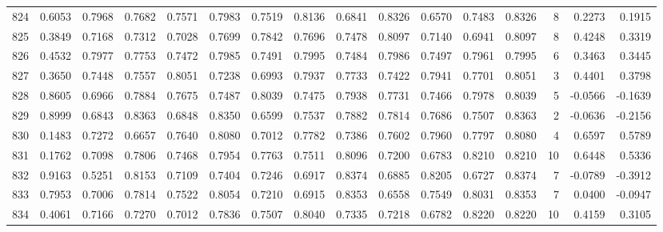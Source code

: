 \begin{tabular}{lrrrrrrrrrrrrrrr}
824 &      0.6053 &  0.7968 &  0.7682 &  0.7571 &  0.7983 &  0.7519 &  0.8136 &  0.6841 &  0.8326 &  0.6570 &   0.7483 &     0.8326 &      8 &                    0.2273 &                     0.1915 \\
825 &      0.3849 &  0.7168 &  0.7312 &  0.7028 &  0.7699 &  0.7842 &  0.7696 &  0.7478 &  0.8097 &  0.7140 &   0.6941 &     0.8097 &      8 &                    0.4248 &                     0.3319 \\
826 &      0.4532 &  0.7977 &  0.7753 &  0.7472 &  0.7985 &  0.7491 &  0.7995 &  0.7484 &  0.7986 &  0.7497 &   0.7961 &     0.7995 &      6 &                    0.3463 &                     0.3445 \\
827 &      0.3650 &  0.7448 &  0.7557 &  0.8051 &  0.7238 &  0.6993 &  0.7937 &  0.7733 &  0.7422 &  0.7941 &   0.7701 &     0.8051 &      3 &                    0.4401 &                     0.3798 \\
828 &      0.8605 &  0.6966 &  0.7884 &  0.7675 &  0.7487 &  0.8039 &  0.7475 &  0.7938 &  0.7731 &  0.7466 &   0.7978 &     0.8039 &      5 &                   -0.0566 &                    -0.1639 \\
829 &      0.8999 &  0.6843 &  0.8363 &  0.6848 &  0.8350 &  0.6599 &  0.7537 &  0.7882 &  0.7814 &  0.7686 &   0.7507 &     0.8363 &      2 &                   -0.0636 &                    -0.2156 \\
830 &      0.1483 &  0.7272 &  0.6657 &  0.7640 &  0.8080 &  0.7012 &  0.7782 &  0.7386 &  0.7602 &  0.7960 &   0.7797 &     0.8080 &      4 &                    0.6597 &                     0.5789 \\
831 &      0.1762 &  0.7098 &  0.7806 &  0.7468 &  0.7954 &  0.7763 &  0.7511 &  0.8096 &  0.7200 &  0.6783 &   0.8210 &     0.8210 &     10 &                    0.6448 &                     0.5336 \\
832 &      0.9163 &  0.5251 &  0.8153 &  0.7109 &  0.7404 &  0.7246 &  0.6917 &  0.8374 &  0.6885 &  0.8205 &   0.6727 &     0.8374 &      7 &                   -0.0789 &                    -0.3912 \\
833 &      0.7953 &  0.7006 &  0.7814 &  0.7522 &  0.8054 &  0.7210 &  0.6915 &  0.8353 &  0.6558 &  0.7549 &   0.8031 &     0.8353 &      7 &                    0.0400 &                    -0.0947 \\
834 &      0.4061 &  0.7166 &  0.7270 &  0.7012 &  0.7836 &  0.7507 &  0.8040 &  0.7335 &  0.7218 &  0.6782 &   0.8220 &     0.8220 &     10 &                    0.4159 &                     0.3105 \\

\end{tabular}
